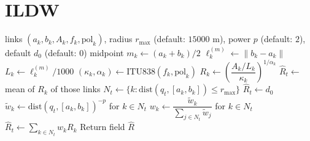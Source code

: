 \documentclass[11pt]{article}
\begin{document}
\section*{ILDW}
\begin{algorithm}[h]
\caption{Segment-Distance ILDW}
\begin{algorithmic}[1]
\Require links $(a_k,b_k,A_k,f_k,\text{pol}_k)$, radius $r_{\max}$ (default: $15000$ m), power $p$ (default: $2$), default $d_0$ (default: $0$)
\State midpoint $m_k \gets (a_k+b_k)/2$
\State $\ell_k^{(m)} \gets \|b_k-a_k\|$ 
\State $L_k \gets \ell_k^{(m)}/1000$ 
\State $(\kappa_k,\alpha_k) \gets \mathrm{ITU838}(f_k,\text{pol}_k)$
\State $R_k \gets \left(\dfrac{A_k/L_k}{\kappa_k}\right)^{1/\alpha_k}$ 
\EndFor
{}
\State $\hat R_t \gets$ mean of $R_k$ of those links
\Else
\State $N_t \gets \{k : \mathrm{dist}(q_t,[a_k,b_k]) \le r_{\max}\}$ 
\State $\hat R_t \gets d_0$
\Else
\State $\tilde w_k \gets \mathrm{dist}(q_t,[a_k,b_k])^{-p}$ for $k\in N_t$
\State $w_k \gets \dfrac{\tilde w_k}{\sum_{j\in N_t}\tilde w_j}$ for $k\in N_t$
\State $\hat R_t \gets \sum_{k\in N_t} w_k R_k$
\EndIf
\EndIf
\EndFor
\State Return field $\hat R$
\end{algorithmic}
\end{algorithm}
\end{document}

